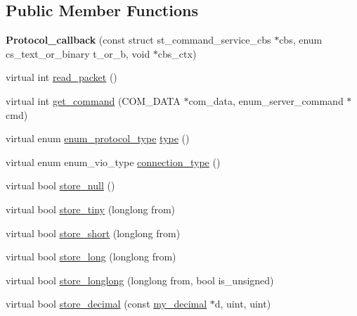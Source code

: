 \subsection*{Public Member Functions}
\begin{DoxyCompactItemize}
\item 
\mbox{\label{classProtocol__callback_a0f3670957c4e1ecd2ea5b09e79e2600b}} 
{\bfseries Protocol\+\_\+callback} (const struct st\+\_\+command\+\_\+service\+\_\+cbs $\ast$cbs, enum cs\+\_\+text\+\_\+or\+\_\+binary t\+\_\+or\+\_\+b, void $\ast$cbs\+\_\+ctx)
\item 
virtual int \mbox{\hyperlink{classProtocol__callback_a42c79ab20047c154ff73d8d732563928}{read\+\_\+packet}} ()
\item 
virtual int \mbox{\hyperlink{classProtocol__callback_a87b4bf121b5c2851ae2948ca0ea02e37}{get\+\_\+command}} (C\+O\+M\+\_\+\+D\+A\+TA $\ast$com\+\_\+data, enum\+\_\+server\+\_\+command $\ast$cmd)
\item 
virtual enum \mbox{\hyperlink{classProtocol_ab1d147a8122f4ea4f8516ee23c514b02}{enum\+\_\+protocol\+\_\+type}} \mbox{\hyperlink{classProtocol__callback_a35ef2c30f27cf89c4b0c8ddf1cf40917}{type}} ()
\item 
virtual enum enum\+\_\+vio\+\_\+type \mbox{\hyperlink{classProtocol__callback_a9370ee5a33a72f9bfae1fcab09fb3bac}{connection\+\_\+type}} ()
\item 
virtual bool \mbox{\hyperlink{classProtocol__callback_a25f50034be8c1d9991c8794acb04c6d7}{store\+\_\+null}} ()
\item 
virtual bool \mbox{\hyperlink{classProtocol__callback_af25c2ef62aa546adf96045007292c3d2}{store\+\_\+tiny}} (longlong from)
\item 
virtual bool \mbox{\hyperlink{classProtocol__callback_ad456eec2e3012513ed0291d99e5d9831}{store\+\_\+short}} (longlong from)
\item 
virtual bool \mbox{\hyperlink{classProtocol__callback_a30fe6ec3449e2a688e84cf106fe360c6}{store\+\_\+long}} (longlong from)
\item 
virtual bool \mbox{\hyperlink{classProtocol__callback_a176f96a6a2a5e47f4eb914e6d8ba9444}{store\+\_\+longlong}} (longlong from, bool is\+\_\+unsigned)
\item 
virtual bool \mbox{\hyperlink{classProtocol__callback_a67178d939a62516c96c21e56fb6f7b0e}{store\+\_\+decimal}} (const \mbox{\hyperlink{classmy__decimal}{my\+\_\+decimal}} $\ast$d, uint, uint)
\item 

\end{DoxyCompactItemize}
